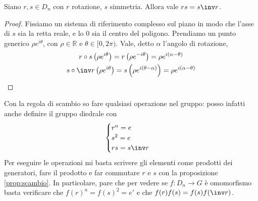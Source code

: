 \documentclass[a4paper,10pt,oneside]{math_article}
\begin{document}
      \begin{myprop}\label{prop:scambio}
       Siano $r,s \in D_n$ con $r$ rotazione, $s$ simmetria. Allora vale $rs=s\inv r$.
      \end{myprop}
      \begin{proof}
       Fissiamo un sistema di riferimento complesso sul piano in modo che l'asse di $s$ sia la retta reale, e lo $0$ sia il centro del poligono. Prendiamo un punto generico $\rho e^{i\theta}$, con $\rho \in \mathbb R$ e $\theta \in [0,2\pi)$. Vale, detto $\alpha$ l'angolo di rotazione,
       \begin{gather*}
        r\circ s\left(\rho e^{i\theta}\right) = r\left(\rho e^{-i\theta}\right) = \rho e^{i(\alpha-\theta)} \\
        s \circ \inv r\left(\rho e^{i\theta}\right)= s\left(\rho e^{i(\theta-\alpha)}\right) = \rho e^{i(\alpha-\theta)}
       \end{gather*}

      \end{proof}
      
      Con la regola di scambio so fare qualsiasi operazione nel gruppo: posso infatti anche definire il gruppo diedrale con 
      \[
	\begin{cases}
	  r^n = e\\
	  s^2 = e\\
	  rs=s\inv r	  
	\end{cases}
      \]
      Per eseguire le operazioni mi basta scrivere gli elementi come prodotti dei generatori, fare il prodotto e far commutare $r$ e $s$ con la proposizione \ref{prop:scambio}. In particolare, pare che per vedere se $f: D_n \rightarrow G$ è omomorfismo basta verificare che $f(r)^n=f(s)^2=e'$ e che $f(r)f(s)=f(s)f(\inv r)$.
\end{document}
